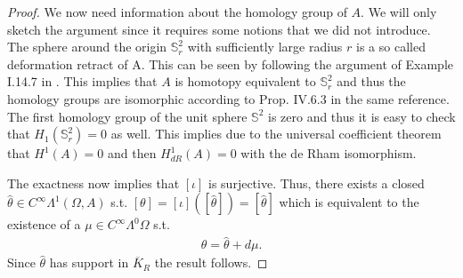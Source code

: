 \documentclass[../master_thesis.tex]{subfiles}
\begin{document}
\begin{proof}
    We now need information about the homology group of $A$. We will only sketch the argument 
    since it requires some notions that we did not introduce. The sphere 
    around the origin
    $\mathbb{S}^2_r$ with sufficiently large radius $r$ is a so called deformation retract of A. 
    This can be seen by following the argument of Example I.14.7 in \cite{topology_and_geometry}. This implies that
    $A$ is homotopy equivalent to $\mathbb{S}^2_r$ and thus the homology groups are 
    isomorphic according to Prop. IV.6.3 in the same reference. The first homology group of the unit sphere 
    $\mathbb{S}^2$ is zero and thus it is easy to check that $H_1(\mathbb{S}^2_r) = 0$
    as well.
    This implies due to the universal coefficient 
    theorem that $H^1(A) = 0$ and then $H^1_{dR}(A) = 0$ with the de Rham isomorphism. 
    
    The exactness now implies that 
    $[\iota]$ is surjective. Thus, there exists a closed $\hat{\theta}\in C^\infty \Lambda^1(\Omega, A)$
    s.t. 
    $[\theta] = [\iota]([\hat{\theta}]) = [\hat{\theta}]$ which is equivalent to the 
    existence of a $\mu \in C^\infty \Lambda^0 \Omega$ s.t. 
    \begin{align*}
        \theta = \hat{\theta} + d\mu.
    \end{align*}
    Since $\hat{\theta}$ has support in $\overline{K}_R$ the result follows.
\end{proof}
\end{document}
